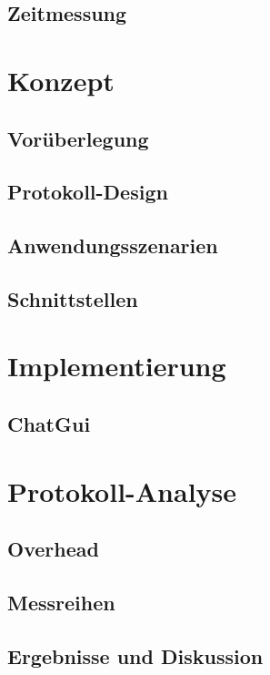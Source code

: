 \documentclass[
    11pt, %
    DIV=11,
    ngerman, %
    a4paper, %
    oneside, %
    titlepage, %
    parskip=half, %
    headings=normal, %
    listof=totoc, %
    bibliography=totoc, %
    bibliographyWebverzeichnis=totoc,
    index=totoc, %
    captions=tableheading, %
    final %
]{scrreprt}
\begin{document}
	\section{Zeitmessung}
		
	
\chapter{Konzept}
	
	\section{Vorüberlegung}
		
	\section{Protokoll-Design}
		
	\section{Anwendungsszenarien}
		
	\section{Schnittstellen}
		
	
\chapter{Implementierung}
	
	\section{ChatGui}
	
	
\chapter{Protokoll-Analyse}	
	
	\section{Overhead}
		
	\section{Messreihen}
		
	\section{Ergebnisse und Diskussion}
		
	
\end{document}
